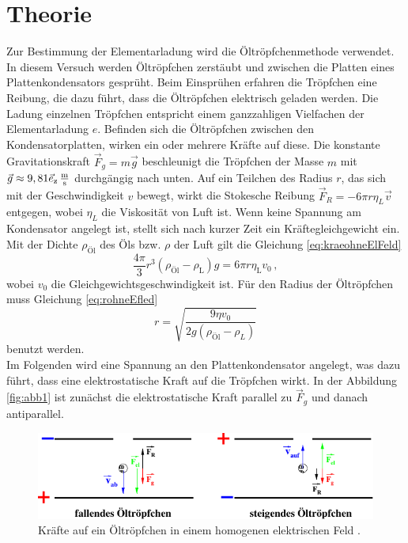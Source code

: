 \section{Theorie}
\label{sec:Theorie}

Zur Bestimmung der Elementarladung wird die Öltröpfchenmethode verwendet. 
In diesem Versuch werden Öltröpfchen zerstäubt und zwischen die Platten eines Plattenkondensators gesprüht.
Beim Einsprühen erfahren die Tröpfchen eine Reibung, die dazu führt, dass die Öltröpfchen elektrisch geladen werden.
Die Ladung einzelnen Tröpfchen entspricht einem ganzzahligen Vielfachen der Elementarladung $e$.
Befinden sich die Öltröpfchen zwischen den Kondensatorplatten, wirken ein oder mehrere Kräfte auf diese. 
Die konstante Gravitationskraft $\vec{F}_g = m \vec{g}$ beschleunigt die Tröpfchen der Masse $m$ mit $\vec{g} \approx 9,81 \vec{e}_\text{z} \,\si{\frac{\meter}{\second}}$ durchgängig nach unten.
Auf ein Teilchen des Radius $r$, das sich mit der Geschwindigkeit $v$ bewegt, wirkt die Stokesche Reibung $\vec{F}_R = -6 \pi r \eta_L \vec{v}$ entgegen, wobei $\eta_L$ die Viskosität von Luft ist.
Wenn keine Spannung am Kondensator angelegt ist, stellt sich nach kurzer Zeit ein Kräftegleichgewicht ein.
Mit der Dichte $\rho_\text{Öl}$ des Öls bzw. $\rho$ der Luft gilt die Gleichung \eqref{eq:kraeohneElFeld}
\begin{equation}
    \frac{4 \pi}{3} r^3(\rho_\text{Öl} - \rho_\text{L})g = 6 \pi r \eta_\text{L} v_0 \, ,
    \label{eq:kraeohneElFeld}
\end{equation}
wobei $v_0$ die Gleichgewichtsgeschwindigkeit ist. 
Für den Radius der Öltröpfchen muss Gleichung \eqref{eq:rohneEfled}
\begin{equation}
    r = \sqrt{\frac{9 \eta v_0}{2 g (\rho_\text{Öl} - \rho_L)}}
    \label{eq:rohneEfled}
\end{equation}
benutzt werden.\\

Im Folgenden wird eine Spannung an den Plattenkondensator angelegt, was dazu führt, dass eine elektrostatische Kraft auf die Tröpfchen wirkt.
In der Abbildung \autoref{fig:abb1} ist zunächst die elektrostatische Kraft parallel zu $\vec{F}_g$ und danach antiparallel.


\begin{figure}[H]
    \centering
    \includegraphics{figures/Abb1.pdf}
    \caption{Kräfte auf ein Öltröpfchen in einem homogenen elektrischen Feld \cite{ap12}.}
    \label{fig:abb1}
\end{figure}


